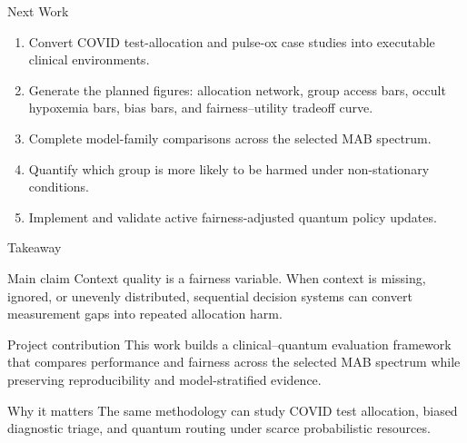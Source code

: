 \documentclass[aspectratio=169,10pt]{beamer}
\begin{document}
\begin{frame}{Next Work}
\begin{enumerate}
    \item Convert COVID test-allocation and pulse-ox case studies into executable clinical environments.
    \item Generate the planned figures: allocation network, group access bars, occult hypoxemia bars, bias bars, and fairness--utility tradeoff curve.
    \item Complete model-family comparisons across the selected MAB spectrum.
    \item Quantify which group is more likely to be harmed under non-stationary conditions.
    \item Implement and validate active fairness-adjusted quantum policy updates.
\end{enumerate}
\end{frame}

\begin{frame}{Takeaway}
\begin{block}{Main claim}
Context quality is a fairness variable. When context is missing, ignored, or unevenly distributed, sequential decision systems can convert measurement gaps into repeated allocation harm.
\end{block}

\begin{block}{Project contribution}
This work builds a clinical--quantum evaluation framework that compares performance and fairness across the selected MAB spectrum while preserving reproducibility and model-stratified evidence.
\end{block}

\begin{block}{Why it matters}
The same methodology can study COVID test allocation, biased diagnostic triage, and quantum routing under scarce probabilistic resources.
\end{block}
\end{frame}
\end{document}
